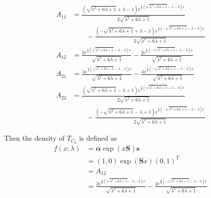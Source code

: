 \documentclass{article}
\theoremstyle{plain}
\theoremstyle{definition}
\theoremstyle{remark}
\numberwithin{equation}{section}
\begin{document}
\begin{align*}
A_{11} &= \frac{\left(\sqrt{\lambda ^2+6 \lambda +1}+\lambda -1\right) e^{\frac{1}{2}
   \left(\sqrt{\lambda ^2+6 \lambda +1}-\lambda -3\right) x}}{2 \sqrt{\lambda ^2+6
   \lambda +1}}\\
   &\quad\quad- \frac{\left(-\sqrt{\lambda ^2+6 \lambda +1}+\lambda -1\right)
   e^{\frac{1}{2} \left(-\sqrt{\lambda ^2+6 \lambda +1}-\lambda -3\right) x}}{2
   \sqrt{\lambda ^2+6 \lambda +1}}\\
   A_{12} &= \frac{2 e^{\frac{1}{2} \left(\sqrt{\lambda ^2+6
   \lambda +1}-\lambda -3\right) x}}{\sqrt{\lambda ^2+6 \lambda +1}}-\frac{2
   e^{\frac{1}{2} \left(-\sqrt{\lambda ^2+6 \lambda +1}-\lambda -3\right)
   x}}{\sqrt{\lambda ^2+6 \lambda +1}}\\
   A_{21} &= \frac{\lambda  e^{\frac{1}{2} \left(\sqrt{\lambda ^2+6 \lambda +1}-\lambda -3\right)
   x}}{\sqrt{\lambda ^2+6 \lambda +1}}-\frac{\lambda  e^{\frac{1}{2}
   \left(-\sqrt{\lambda ^2+6 \lambda +1}-\lambda -3\right) x}}{\sqrt{\lambda ^2+6
   \lambda +1}}\\
   A_{22} &= \frac{\left(\sqrt{\lambda ^2+6 \lambda +1}-\lambda +1\right)
   e^{\frac{1}{2} \left(\sqrt{\lambda ^2+6 \lambda +1}-\lambda -3\right) x}}{2
   \sqrt{\lambda ^2+6 \lambda +1}}\\
   &\quad\quad-\frac{\left(-\sqrt{\lambda ^2+6 \lambda
   +1}-\lambda +1\right) e^{\frac{1}{2} \left(-\sqrt{\lambda ^2+6 \lambda +1}-\lambda
   -3\right) x}}{2 \sqrt{\lambda ^2+6 \lambda +1}}
\end{align*}

Then the density of $T_{C_2}$ is defined as
\begin{align}
f(x; \lambda) &= \boldsymbol{\alpha} \exp(x \mathbf{S}) \mathbf{s} \nonumber\\
&= (1, 0) \exp(\mathbf{S} x) (0,1)^T \nonumber\\
&= A_{12} \nonumber\\
&= \frac{2 e^{\frac{1}{2} \left(\sqrt{\lambda ^2+6
   \lambda +1}-\lambda -3\right) x}}{\sqrt{\lambda ^2+6 \lambda +1}}-\frac{2
   e^{\frac{1}{2} \left(-\sqrt{\lambda ^2+6 \lambda +1}-\lambda -3\right)
   x}}{\sqrt{\lambda ^2+6 \lambda +1}} \label{eq:t_density}
\end{align}
\end{document}
